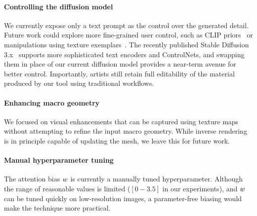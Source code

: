 \paragraph*{Controlling the diffusion model}
We currently expose only a text prompt as the control over the generated detail. 
Future work could explore more fine-grained user control, such as CLIP priors~\cite{stable_unclip_pipeline, dall_e2} or manipulations using texture exemplars~\cite{texsliders}.
The recently published Stable Diffusion 3.x~\cite{SD3,SD3_5_large} supports more sophisticated text encoders and ControlNets, and swapping them in place of our current diffusion model provides a near-term avenue for better control.
Importantly, artists still retain full editability of the material produced by our tool using traditional workflows.

\paragraph*{Enhancing macro geometry} 
We focused on visual enhancements that can be captured using texture maps
without attempting to refine the input macro geometry. 
While inverse rendering is in principle capable of updating the mesh, 
we leave this for future work.


\paragraph*{Manual hyperparameter tuning}
The attention bias $w$ is currently a manually tuned hyperparameter. Although the range of reasonable values is limited ($[0-3.5]$ in our experiments), and $w$ can be tuned quickly on low-resolution images, a parameter-free biasing would make the technique more practical.





